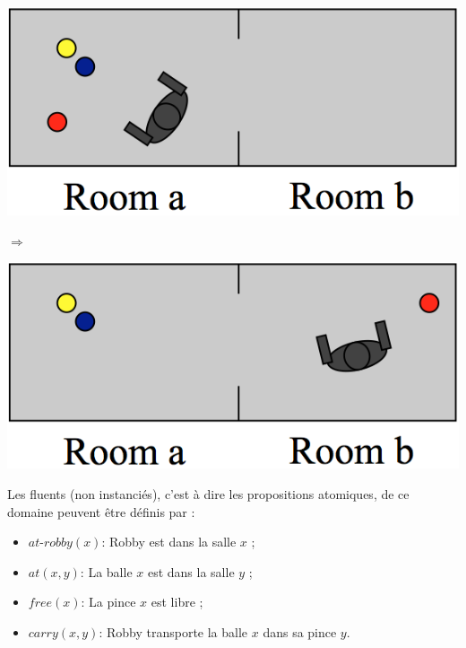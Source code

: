 \begin{center}
  \begin{minipage}[c]{.38\linewidth}
   \includegraphics[scale=0.55]{figures/robby_a_3balls.png}
  \end{minipage}
  \begin{minipage}[c]{.05\linewidth}
    $\Rightarrow$
  \end{minipage}
  \begin{minipage}[c]{.38\linewidth}
    \includegraphics[scale=0.55]{figures/robby_b_3balls.png}
  \end{minipage}
\end{center}


\noindent Les fluents (non instanciés), c'est à dire les propositions atomiques, de ce domaine peuvent être définis par :
\begin{itemize}
	\item $\mathit{at}$-$\mathit{robby}(x)$: Robby est dans la salle $x$ ;
	\item $\mathit{at}(x,y)$: La balle $x$ est dans la salle $y$ ;
	\item $\mathit{free}(x)$: La pince $x$ est libre ;
	\item $\mathit{carry}(x,y)$: Robby transporte la balle $x$ dans sa pince $y$.
\end{itemize}

